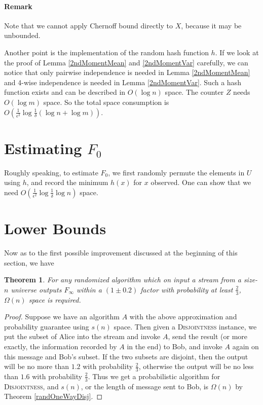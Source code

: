 \documentclass[openany]{book}
\newtheorem{theorem}{Theorem}[chapter]
\begin{document}
\paragraph{Remark}
Note that we cannot apply Chernoff bound directly to $X$, because it may be unbounded.

Another point is the implementation of the random hash function $h$. If we look at the proof of Lemma \ref{2ndMomentMean} and \ref{2ndMomentVar} carefully, we can notice that only pairwise independence is needed in Lemma \ref{2ndMomentMean} and 4-wise independence is needed in Lemma \ref{2ndMomentVar}. Such a hash function exists and can be described in $O(\log n)$ space. The counter $Z$ needs $O(\log m)$ space. So the total space consumption is $O(\frac{1}{\epsilon^2}\log \frac{1}{\delta}(\log n+\log m))$.

\section{Estimating $F_0$}
Roughly speaking, to estimate $F_0$, we first randomly permute the elements in $U$ using $h$, and record the minimum $h(x)$ for $x$ observed. One can show that we need $O(\frac{1}{\epsilon^2}\log \frac{1}{\delta}\log n)$ space.

\section{Lower Bounds}
Now as to the first possible improvement discussed at the beginning of this section, we have
\begin{theorem}
    For any randomized algorithm which on input a stream from a size-$n$ universe outputs $F_{\infty}$ within a $(1\pm0.2)$ factor with probability at least $\frac{2}{3}$, $\Omega(n)$ space is required.
\end{theorem}
\begin{proof}
    Suppose we have an algorithm $A$ with the above approximation and probability guarantee using $s(n)$ space. Then given a \textsc{Disjointness} instance, we put the subset of Alice into the stream and invoke $A$, send the result (or more exactly, the information recorded by $A$ in the end) to Bob, and invoke $A$ again on this message and Bob's subset. If the two subsets are disjoint, then the output will be no more than $1.2$ with probability $\frac{2}{3}$, otherwise the output will be no less than $1.6$ with probability $\frac{2}{3}$. Thus we get a probabilistic algorithm for \textsc{Disjointness}, and $s(n)$, or the length of message sent to Bob, is $\Omega(n)$ by Theorem \ref{randOneWayDisj}.
\end{proof}
\end{document}
